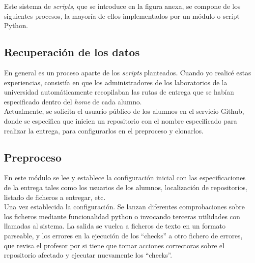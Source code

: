 Este sistema de \textit{scripts}, que se introduce en la figura anexa, se compone de los siguientes procesos, la mayoría de ellos implementados por un módulo o script Python.\\


\subsection{Recuperación de los datos}
\label{sec:rec_datos}


En general es un proceso aparte de los \textit{scripts} planteados. Cuando yo realicé estas experiencias, consistía en que los administradores de los laboratorios de la universidad automáticamente recopilaban las rutas de entrega que se habían especificado dentro del \textit{home} de cada alumno.\\


Actualmente, se solicita el usuario público de los alumnos en el servicio Github, donde se especifica que inicien un repositorio con el nombre especificado para realizar la entrega, para configurarlos en el preproceso y clonarlos.\\



\subsection{Preproceso}
\label{sec:preproceso}


En este módulo se lee y establece la configuración inicial con las especificaciones de la entrega tales como los usuarios de los alumnos, localización de repositorios, listado de ficheros a entregar, etc.\\


Una vez establecida la configuración. Se lanzan diferentes comprobaciones sobre los ficheros mediante funcionalidad python o invocando terceras utilidades con llamadas al sistema. La salida se vuelca a ficheros de texto en un formato parseable, y los errores en la ejecución de los ``checks'' a otro fichero de errores, que revisa el profesor por si tiene que tomar acciones correctoras sobre el repositorio afectado y ejecutar nuevamente los ``checks''.\\


